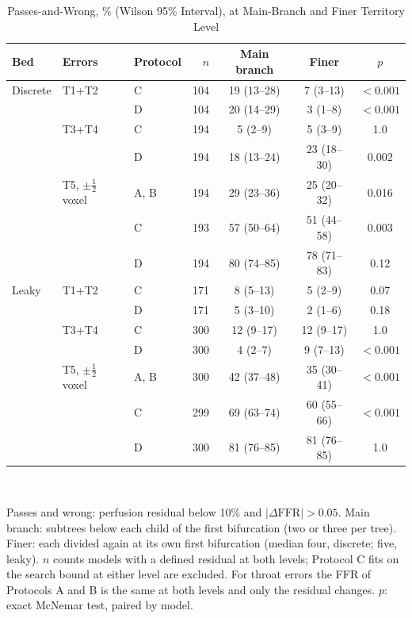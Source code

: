\documentclass[journal,twoside,web,onecolumn]{ieeecolor}
\begin{document}
\begin{table}[!ht]
\caption{Passes-and-Wrong, \% (Wilson 95\% Interval), at Main-Branch and Finer Territory Level}\label{tab:gran}
\centering\footnotesize
\begin{tabular}{@{}lllrccc@{}}
\toprule
Bed & Errors & Protocol & $n$ & Main branch & Finer & $p$\\
\midrule
Discrete & T1+T2 & C & 104 & 19 (13--28) & 7 (3--13) & $<0.001$ \\
 & & D & 104 & 20 (14--29) & 3 (1--8) & $<0.001$ \\
 & T3+T4 & C & 194 & 5 (2--9) & 5 (3--9) & 1.0 \\
 & & D & 194 & 18 (13--24) & 23 (18--30) & 0.002 \\
 & T5, $\pm\tfrac12$ voxel & A, B & 194 & 29 (23--36) & 25 (20--32) & 0.016 \\
 & & C & 193 & 57 (50--64) & 51 (44--58) & 0.003 \\
 & & D & 194 & 80 (74--85) & 78 (71--83) & 0.12 \\
\addlinespace[2pt]
Leaky & T1+T2 & C & 171 & 8 (5--13) & 5 (2--9) & 0.07 \\
 & & D & 171 & 5 (3--10) & 2 (1--6) & 0.18 \\
 & T3+T4 & C & 300 & 12 (9--17) & 12 (9--17) & 1.0 \\
 & & D & 300 & 4 (2--7) & 9 (7--13) & $<0.001$ \\
 & T5, $\pm\tfrac12$ voxel & A, B & 300 & 42 (37--48) & 35 (30--41) & $<0.001$ \\
 & & C & 299 & 69 (63--74) & 60 (55--66) & $<0.001$ \\
 & & D & 300 & 81 (76--85) & 81 (76--85) & 1.0 \\
\bottomrule
\end{tabular}
\\[3pt]
\parbox{0.85\textwidth}{\footnotesize Passes and wrong: perfusion residual below 10\% and $|\Delta\mathrm{FFR}| > 0.05$. Main branch: subtrees below each child of the first bifurcation (two or three per tree). Finer: each divided again at its own first bifurcation (median four, discrete; five, leaky). $n$ counts models with a defined residual at both levels; Protocol C fits on the search bound at either level are excluded. For throat errors the FFR of Protocols A and B is the same at both levels and only the residual changes. $p$: exact McNemar test, paired by model.}
\end{table}

\FloatBarrier
{}
\end{document}
